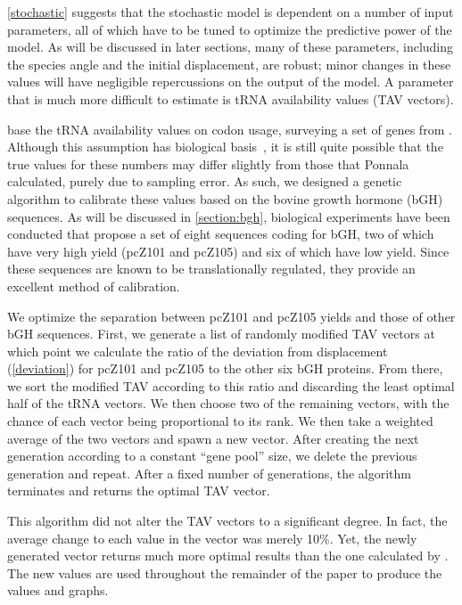 \documentclass[12pt, draft]{article}
\numberwithin{equation}{section}
\begin{document}
\autoref{stochastic} suggests that the stochastic model is dependent
on a number of input parameters, all of which have to be tuned to optimize
the predictive power of the model.  As will be discussed in later sections,
many of these parameters, including the species angle and the initial displacement,
are robust; minor changes in these values will have negligible repercussions
on the output of the model.  A parameter that is much more difficult to estimate
is tRNA availability values (TAV vectors).

\citeauthor{lalit:embs} base the tRNA availability values on codon usage, 
surveying a set of genes from \ecoli.
Although this assumption has biological basis~\cite{ikemura}, 
it is still quite possible that the true values for these numbers may differ 
slightly from those that Ponnala calculated, purely due to sampling error.  
As such, we designed a genetic algorithm to calibrate these values based on the bovine growth hormone (bGH) sequences.
As will be discussed in \autoref{section:bgh}, biological experiments
have been conducted \cite{schoner:bgh} that propose a set of eight sequences coding for bGH,
two of which have very high yield (pcZ101 and pcZ105) and six of which have low yield.
Since these sequences are known to be translationally regulated, they
provide an excellent method of calibration.

We optimize the separation between pcZ101 and pcZ105 yields and those of other bGH sequences.  
First, we generate a list of randomly modified TAV vectors at which
point we calculate the ratio of the deviation from
displacement (\autoref{deviation}) for pcZ101 and pcZ105 to the other
six bGH proteins. From there, we sort the modified TAV according to
this ratio and discarding the least optimal half of the tRNA
vectors. We then choose two of the remaining vectors, with the chance
of each vector being proportional to its rank.  We then take a
weighted average of the two vectors and spawn a new vector.  After
creating the next generation according to a constant ``gene pool''
size, we delete the previous generation and repeat. After a fixed
number of generations, the algorithm terminates and returns the
optimal TAV vector.

This algorithm did not alter the TAV vectors to a significant degree.
In fact, the average change to each value in the vector was merely
10\%.  Yet, the newly generated vector returns much more optimal
results than the one calculated by \citeauthor{lalit:embs}.  The new values
are used throughout the remainder of the paper to produce the 
values and graphs.
\end{document}
